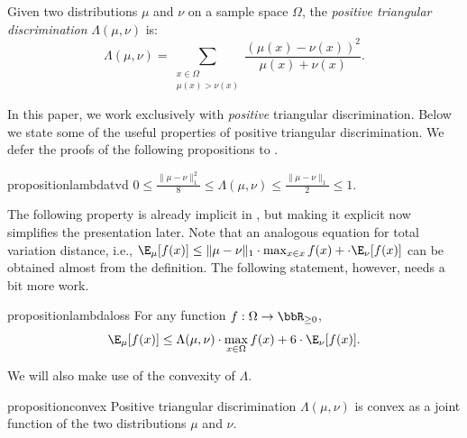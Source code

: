 \begin{definition}
    Given two distributions $\mu$ and $\nu$ on a sample space $\Omega$, the \textit{positive triangular discrimination} 
    $\Lambda(\mu,\nu)$ is:
    \[
    \Lambda(\mu, \nu) = \sum_{\substack{x \in \Omega\\\mu(x) > \nu(x)}}\frac{(\mu(x) - \nu(x))^2}{\mu(x) + \nu(x)}.  %
    \]
\end{definition}

In this paper, we work exclusively with \textit{positive} triangular discrimination. Below we state some of the useful properties of positive triangular discrimination. We defer the proofs of the following propositions to .


\begin{restatable}{proposition}{lambdatvd}\label{prop:prop-lambda}
$0 \le \frac{\|\mu - \nu\|^2_1} 8\leq \Lambda(\mu, \nu)\leq \frac{\|\mu - \nu\|_1} 2 \le 1$. 
\end{restatable}


The following property is already implicit in \cite{Yehudayoff20}, but making it explicit now simplifies the presentation later. Note that an analogous equation for total variation distance, i.e., $\E_\mu[f(x)] \le \|\mu-\nu\|_1\cdot \max_{x \in x} f(x) + \cdot \E_{\nu}[f(x)]$ can be obtained almost from the definition. The following statement, however, needs a bit more work.

\begin{restatable}{proposition}{lambdaloss}\label{itm:lambda-loss}
For any function $f:\Omega\to\bbR_{\ge 0}$,
\[ \E_\mu[f(x)] \le \Lambda(\mu,\nu)\cdot \max_{x \in \Omega} f(x) + 6 \cdot \E_{\nu}[f(x)]. \]
\end{restatable}



\noindent
We will also make use of the convexity of $\Lambda$.

\begin{restatable}{proposition}{convex}\label{prop:convex}
Positive triangular discrimination $\Lambda(\mu,\nu)$ is convex as a joint function of the two distributions $\mu$ and $\nu$. 
\end{restatable}




